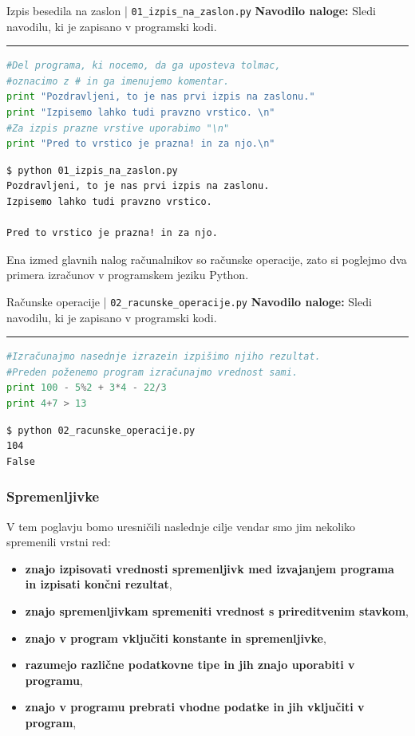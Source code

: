 \begin{examplebox}[label={prog:izpis}]{Izpis besedila na zaslon |
    \texttt{01\_izpis\_na\_zaslon.py} \cite{web:PTHardWay}}
  \textbf{Navodilo naloge:} Sledi navodilu, ki je zapisano v programski
  kodi.
\rule{\textwidth}{.4pt}
\begin{lstlisting}[language=Python]
#Del programa, ki nocemo, da ga uposteva tolmac,
#oznacimo z # in ga imenujemo komentar.
print "Pozdravljeni, to je nas prvi izpis na zaslonu."
print "Izpisemo lahko tudi pravzno vrstico. \n"
#Za izpis prazne vrstive uporabimo "\n"
print "Pred to vrstico je prazna! in za njo.\n"
\end{lstlisting}
\tcblower
\begin{Verbatim}[fontsize=\footnotesize]
$ python 01_izpis_na_zaslon.py
Pozdravljeni, to je nas prvi izpis na zaslonu.
Izpisemo lahko tudi pravzno vrstico.

Pred to vrstico je prazna! in za njo.
\end{Verbatim}
\end{examplebox}

Ena izmed glavnih nalog računalnikov so računske operacije, zato si
poglejmo dva primera izračunov v programskem jeziku Python.

\begin{examplebox}[label={prog:racunske_operacije}]{Računske operacije |
    \texttt{02\_racunske\_operacije.py} \cite{web:PTHardWay}}
  \textbf{Navodilo naloge:} Sledi navodilu, ki je zapisano v programski
  kodi.
\rule{\textwidth}{.4pt}
\begin{lstlisting}[language=Python]
#Izračunajmo nasednje izrazein izpišimo njiho rezultat.
#Preden poženemo program izračunajmo vrednost sami.
print 100 - 5%2 + 3*4 - 22/3
print 4+7 > 13
\end{lstlisting}
\tcblower
\begin{Verbatim}[fontsize=\footnotesize]
$ python 02_racunske_operacije.py
104
False
\end{Verbatim}
\end{examplebox}

\subsubsection{Spremenljivke}
\label{sec:spremenljivke}

V tem poglavju bomo uresničili naslednje cilje vendar smo jim nekoliko
spremenili vrstni red:
\begin{itemize}
\tightlist
\item \textbf{znajo izpisovati vrednosti spremenljivk med izvajanjem programa
  in izpisati končni rezultat},
\item \textbf{znajo spremenljivkam spremeniti vrednost s prireditvenim
  stavkom},
\item \textbf{znajo v program vključiti konstante in spremenljivke},
\item \textbf{ razumejo različne podatkovne tipe in jih znajo uporabiti v
  programu},
\item \textbf{znajo v programu prebrati vhodne podatke in jih vključiti v
  program},
\end{itemize}

